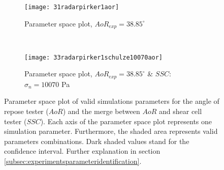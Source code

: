 \documentclass[review]{elsarticle}
\begin{document}
\begin{figure}[htp] \centering
    \begin{subfigure}[b]{0.96\columnwidth}
        \texttt{[image: 31radarpirker1aor]}
        \caption{Parameter space plot, $AoR_{exp} = 38.85 ^\circ$}
        \label{fig:31radarpirker1aor} 
    \end{subfigure}\\
        \begin{subfigure}[b]{0.96\columnwidth}
        \texttt{[image: 33radarpirker1schulze10070aor]}
        \caption{Parameter space plot, $AoR_{exp} = 38.85
        ^\circ$ \& $SSC$: $\sigma_n=10070$ Pa}
        \label{fig:33radarpirker1schulze10070aor} 
    \end{subfigure}
    \caption[Parameter space plot of valid simulations parameters for the AoR and
    the merge between AoR and SSC valid parameters]{Parameter space plot of
    valid simulations parameters for the angle of repose tester ($AoR$) and the merge
    between $AoR$ and shear cell tester ($SSC$).
    Each axis of the parameter space plot represents one simulation parameter.
    Furthermore, the shaded area represents valid parameters combinations.
    Dark shaded values stand for the confidence interval.
    Further explanation in section \ref{subsec:experimentsparameteridentification}.}
    \label{fig:35schulze10070aorradarandcloud}
\end{figure}
\end{document}
